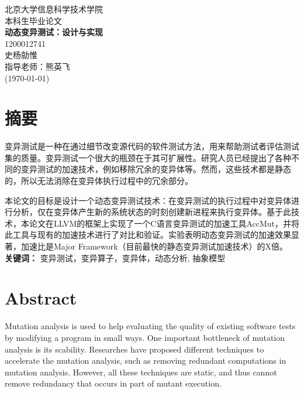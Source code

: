 \documentclass[nofonts]{ctexrep}
\begin{document}
%
\begin{titlepage}
\begin{center}
\LARGE

\vspace{20mm}
北京大学信息科学技术学院\\
\vspace{5mm}
本科生毕业论文\\
\vspace{70mm}
\textbf{\huge 动态变异测试：设计与实现}\\
\vspace{20mm}
1200012741\\
史杨勍惟\\
\vspace{20mm}
指导老师：熊英飞\\
\vspace{10mm}
(\today)
\end{center}
\end{titlepage}

\renewcommand{\baselinestretch}{1.5}

\large
\chapter*{摘要}
变异测试是一种在通过细节改变源代码的软件测试方法，用来帮助测试者评估测试集的质量。变异测试一个很大的瓶颈在于其可扩展性。研究人员已经提出了各种不同的变异测试的加速技术，例如移除冗余的变异体等。然而，这些技术都是静态的，所以无法消除在变异体执行过程中的冗余部分。

本论文的目标是设计一个动态变异测试技术：在变异测试的执行过程中对变异体进行分析，仅在变异体产生新的系统状态的时刻创建新进程来执行变异体。基于此技术，本论文在LLVM的框架上实现了一个C语言变异测试的加速工具AccMut，并将此工具与现有的加速技术进行了对比和验证。实验表明动态变异测试的加速效果显著，加速比是Major Framework（目前最快的静态变异测试加速技术）的X倍。\\

\textbf{关键词：} 变异测试，变异算子，变异体，动态分析, 抽象模型
\chapter*{Abstract}
Mutation analysis is used to help evaluating the quality of existing software tests by modifying a program in small ways. One important bottleneck of mutation analysis is its scability. Researches have proposed different techniques to accelerate the mutation analysis, such as removing redundant computations in mutation analysis. However, all these techniques are static, and thus cannot remove redundancy that occurs in part of mutant execution. 
\end{document}
